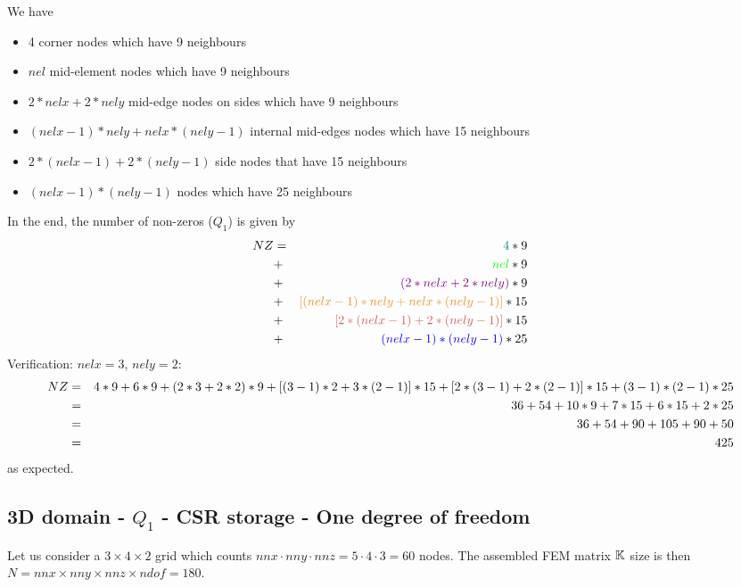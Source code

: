 We have
\begin{itemize}
\item {\color{teal} 4} corner nodes which have 9 neighbours
\item {\color{green} $nel$} mid-element nodes which have 9 neighbours
\item {\color{violet} $2*nelx+2*nely$} mid-edge nodes on sides which have 9 neighbours
\item {\color{carrotorange} $(nelx-1)*nely+nelx*(nely-1)$} internal mid-edges nodes which have 15 neighbours
\item {\color{chestnut} $2*(nelx-1)+2*(nely-1)$} side nodes that have 15 neighbours 
\item {\color{blue} $(nelx-1)*(nely-1)$} nodes which have 25 neighbours
\end{itemize}
In the end, the number of non-zeros ($Q_1$) is given by
\begin{eqnarray}
NZ 
&=& {\color{teal} 4 }*9 \nn\\
&+& {\color{green} nel }*9 \nn\\
&+& {\color{violet} (2*nelx+2*nely) }*9 \nn\\
&+& {\color{carrotorange} [(nelx-1)*nely+nelx*(nely-1)] }*15 \nn\\
&+& {\color{chestnut} [2*(nelx-1)+2*(nely-1)] }*15 \nn\\
&+& {\color{blue} (nelx-1)*(nely-1) }*25 \nn
\end{eqnarray}
Verification: $nelx=3$, $nely=2$:
\begin{eqnarray}
NZ
&=& 4*9 + 6*9 + (2*3+2*2)*9 + [(3-1)*2+3*(2-1)]*15
+ [2*(3-1)+2*(2-1)]*15 + (3-1)*(2-1)*25 \nonumber\\
&=& 36 + 54 + 10*9 + 7*15 + 6*15 + 2*25 \nonumber\\
&=& 36 + 54 + 90 + 105 + 90 + 50  \nonumber\\
&=& 425 \nonumber
\end{eqnarray}
as expected.








\subsection{3D domain - $Q_1$ - CSR storage - One degree of freedom}

Let us consider a $3\times4\times2$ grid which counts 
$nnx\cdot nny \cdot nnz = 5 \cdot 4\cdot 3=60$ nodes.
The assembled FEM matrix ${\mathbb{K}}$ size is then 
$N=nnx\times nny\times nnz \times ndof=180$.

